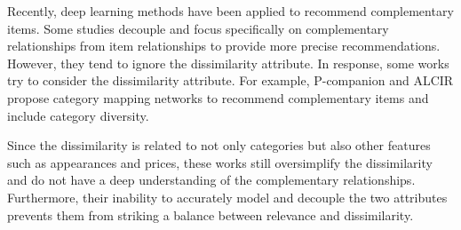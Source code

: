 \documentclass[letterpaper]{article} %
\newcommand{\suhang}[1]{\textcolor{blue}{SW: #1}}
\begin{document}
Recently, deep learning methods have been applied to recommend complementary items. Some studies \cite{mcauley2015inferring, wang2018path, cen2019representation, liu2020decoupled, wu2022towards, chen2023enhanced} decouple and focus specifically on complementary relationships from item relationships to provide more precise recommendations. 
However, they tend to ignore the dissimilarity attribute. In response, some works try to consider the dissimilarity attribute. For example, P-companion \cite{hao2020p} and ALCIR \cite{bibas2023semi} propose category mapping networks to recommend complementary items and include category diversity.

Since the dissimilarity is related to not only categories but also other features such as appearances and prices, these works still oversimplify the dissimilarity and do not have a deep understanding of the complementary relationships. Furthermore, their inability to accurately model and decouple the two attributes prevents them from striking a balance between relevance and dissimilarity.

\end{document}

